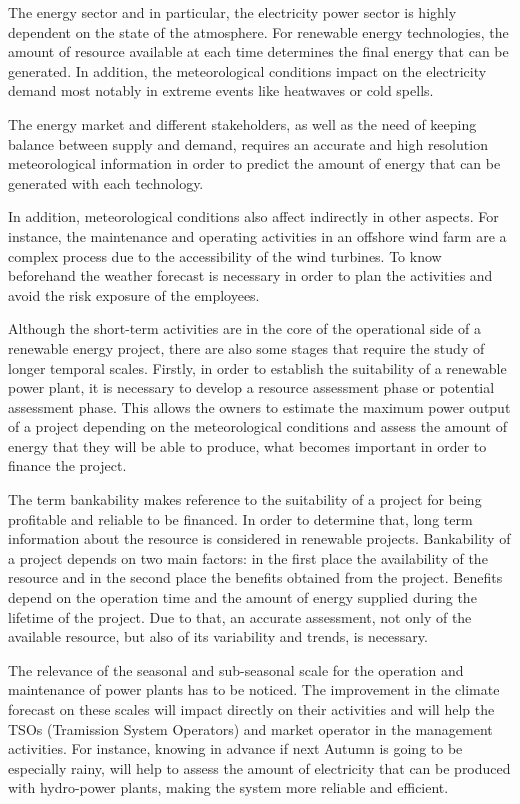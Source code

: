 The energy sector and in particular, the electricity power sector is highly dependent on the state of the atmosphere. For renewable energy technologies, the amount of resource available at each time determines the final energy that can be generated. In addition, the meteorological conditions impact on the electricity demand most notably in extreme events like heatwaves or cold spells.

The energy market and different stakeholders, as well as the need of keeping balance between supply and demand, requires an accurate and high resolution meteorological information in order to predict the amount of energy that can be generated with each technology. 

In addition, meteorological conditions also affect indirectly in other aspects. For instance, the maintenance and operating activities in an offshore wind farm are a complex process due to the accessibility of the wind turbines. To know beforehand the weather forecast is necessary in order to plan the activities and avoid the risk exposure of the employees.

Although the short-term activities are in the core of the operational side of a renewable energy project, there are also some stages that require the study of longer temporal scales. Firstly, in order to establish the suitability of a renewable power plant, it is necessary to develop a resource assessment phase or potential assessment phase. This allows the owners to estimate the maximum power output of a project depending on the meteorological conditions and assess the amount of energy that they will be able to produce, what becomes important in order to finance the project.  

The term bankability makes reference to the suitability of a project for being profitable and reliable to be financed. In order to determine that, long term information about the resource is considered in renewable projects. Bankability \cite*{vignola2012b} of a project depends on two main factors: in the first place the availability of the resource and in the second place the benefits obtained from the project. Benefits depend on the operation time and the amount of energy supplied during the lifetime of the project. Due to that, an accurate assessment, not only of the available resource, but also of its variability and trends, is necessary. 

The relevance of the seasonal and sub-seasonal scale for the operation and maintenance of power plants has to be noticed. The improvement in the climate forecast on these scales will impact directly on their activities and will help the TSOs (Tramission System Operators) and market operator in the management activities. For instance, knowing in advance if next Autumn is going to be especially rainy, will help to assess the amount of electricity that can be produced with hydro-power plants, making the system more reliable and efficient.

